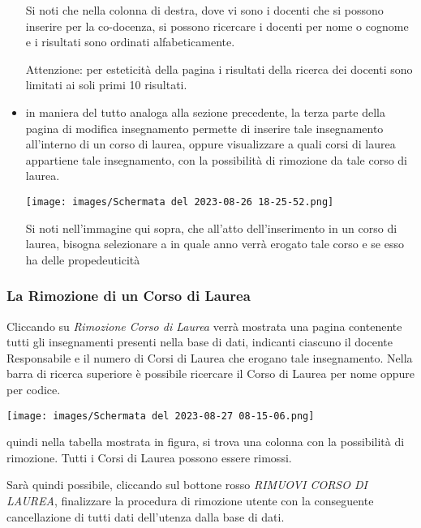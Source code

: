 \documentclass{article}
\begin{document}
\begin{itemize}
        Si noti che nella colonna di destra, dove vi sono i docenti che si possono inserire per la co-docenza, si possono ricercare i docenti per nome o cognome e i risultati sono ordinati alfabeticamente.

        Attenzione: per esteticità della pagina i risultati della ricerca dei docenti sono limitati ai soli primi 10 risultati.

        \item in maniera del tutto analoga alla sezione precedente, la terza parte della pagina di modifica insegnamento permette di inserire tale insegnamento all'interno di un corso di laurea, oppure visualizzare a quali corsi di laurea appartiene tale insegnamento, con la possibilità di rimozione da tale corso di laurea.

        \begin{center}
            \texttt{[image: images/Schermata del 2023-08-26 18-25-52.png]}
        \end{center}

        Si noti nell'immagine qui sopra, che all'atto dell'inserimento in un corso di laurea, bisogna selezionare a in quale anno verrà erogato tale corso e se esso ha delle propedeuticità
    \end{itemize}

    \subsubsection{La Rimozione di un Corso di Laurea}
    Cliccando su \textit{Rimozione Corso di Laurea} verrà mostrata una pagina contenente tutti gli insegnamenti presenti nella base di dati, indicanti ciascuno il docente Responsabile e il numero di Corsi di Laurea che erogano tale insegnamento. Nella barra di ricerca superiore è possibile ricercare il Corso di Laurea per nome oppure per codice.

    \begin{center}
        \texttt{[image: images/Schermata del 2023-08-27 08-15-06.png]}
    \end{center}

    quindi nella tabella mostrata in figura, si trova una colonna con la possibilità di rimozione. Tutti i Corsi di Laurea possono essere rimossi.

    Sarà quindi possibile, cliccando sul bottone rosso \textit{RIMUOVI CORSO DI LAUREA}, finalizzare la procedura di rimozione utente con la conseguente cancellazione di tutti dati dell'utenza dalla base di dati.
\end{document}
